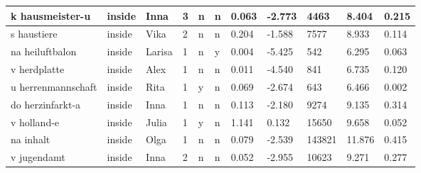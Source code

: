 \begin{longtable}{|p{4cm}|p{1cm}|p{1.2cm}|p{0.5cm}|p{0.5cm}|p{0.5cm}|R{1cm}|R{1cm}|R{1cm}|R{1cm}|R{1cm}|}
k hausmeister-u            & inside            & Inna          & 3                                   & n                          & n                          & 0.063      & -2.773        & 4463                    & 8.404                         & 0.215                   \\ \hline
s haustiere                & inside            & Vika          & 2                                   & n                          & n                          & 0.204      & -1.588        & 7577                    & 8.933                         & 0.114                   \\ \hline
na heiluftbalon       & inside            & Larisa        & 1                                   & n                          & y                          & 0.004      & -5.425        & 542                     & 6.295                         & 0.063                   \\ \hline
v herdplatte               & inside            & Alex          & 1                                   & n                          & n                          & 0.011      & -4.540        & 841                     & 6.735                         & 0.120                   \\ \hline
u herrenmannschaft         & inside            & Rita          & 1                                   & y                          & n                          & 0.069      & -2.674        & 643                     & 6.466                         & 0.002                   \\ \hline
do herzinfarkt-a           & inside            & Inna          & 1                                   & n                          & n                          & 0.113      & -2.180        & 9274                    & 9.135                         & 0.314                   \\ \hline
v holland-e                & inside            & Julia         & 1                                   & y                          & n                          & 1.141      & 0.132         & 15650                   & 9.658                         & 0.052                   \\ \hline
na inhalt                  & inside            & Olga          & 1                                   & n                          & n                          & 0.079      & -2.539        & 143821                  & 11.876                        & 0.415                   \\ \hline
v jugendamt                & inside            & Inna          & 2                                   & n                          & n                          & 0.052      & -2.955        & 10623                   & 9.271                         & 0.277                   \\ \hline

\end{longtable}
